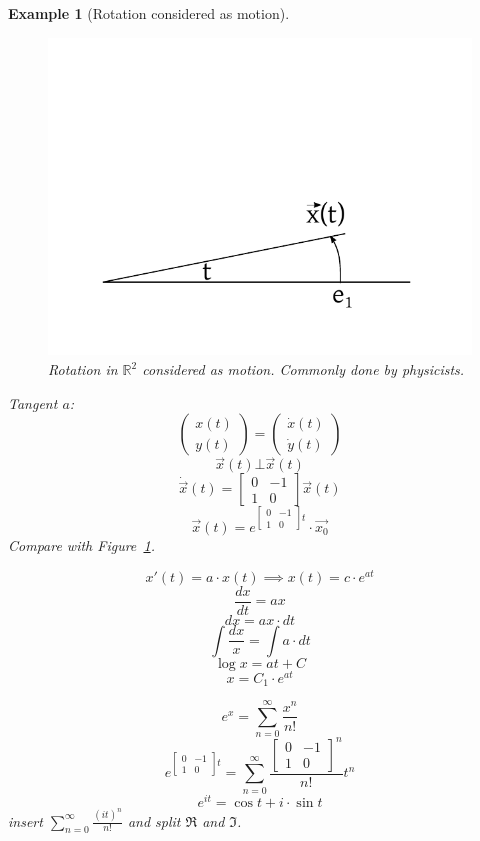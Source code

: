 \documentclass{article}
\newtheorem{example}{Example}  \numberwithin{example}{section}
\newcommand{\vectwo}[2]{\begin{pmatrix} #1 \\ #2 \end{pmatrix}}
\begin{document}
\begin{example}[Rotation considered as motion]
  \begin{figure}[t]
    \begin{center}
      \includegraphics{img/14_rotation_as_motion.pdf}
      \caption{Rotation in $\mathbb R^2$ considered as motion. Commonly done by physicists.}
      \label{img:rotr2mot}
    \end{center}
  \end{figure}

  Tangent $a$:
  \[ \vectwo{x(t)}{y(t)} = \vectwo{\dot{x}(t)}{\dot{y}(t)} \]
  \[ \vec x(t) \bot \vec{x}(t) \]
  \[ \dot\vec{x}(t) = \begin{bmatrix} 0 & -1 \\ 1 & 0 \end{bmatrix} \vec{x}(t) \]
  \[ \vec{x}(t) = e^{\begin{bmatrix} 0 & -1 \\ 1 & 0 \end{bmatrix} t} \cdot \vec{x_0} \]
  Compare with Figure~\ref{img:rotr2mot}.

  \[ x'(t) = a\cdot x(t) \implies x(t) = c \cdot e^{at} \]
  \[ \frac{dx}{dt} = ax \]
  \[ dx = ax \cdot dt \]
  \[ \int \frac{dx}{x} = \int a \cdot dt \]
  \[ \log{x} = at + C \]
  \[ x = C_1 \cdot e^{at} \]

  \[ e^x = \sum_{n=0}^\infty \frac{x^n}{n!} \]
  \[ e^{\begin{bmatrix} 0 & -1 \\ 1 & 0 \end{bmatrix}t} = \sum_{n=0}^\infty \frac{\begin{bmatrix} 0 & -1 \\ 1 & 0 \end{bmatrix}^n}{n!} t^n \]
  \[ e^{it} = \cos{t} + i \cdot \sin{t} \]
  insert $\sum_{n=0}^\infty \frac{(it)^n}{n!}$ and split $\Re$ and $\Im$.


\end{example}
\end{document}
